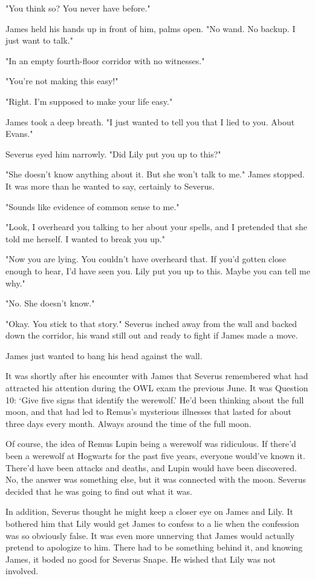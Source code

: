 "You think so? You never have before."

James held his hands up in front of him, palms open. "No wand. No backup. I just want to talk."

"In an empty fourth-floor corridor with no witnesses."

"You're not making this easy!"

"Right. I'm supposed to make your life easy."

James took a deep breath. "I just wanted to tell you that I lied to you. About Evans."

Severus eyed him narrowly. "Did Lily put you up to this?"

"She doesn't know anything about it. But she won't talk to me." James stopped. It was more than he wanted to say, certainly to Severus.

"Sounds like evidence of common sense to me."

"Look, I overheard you talking to her about your spells, and I pretended that she told me herself. I wanted to break you up."

"Now you are lying. You couldn't have overheard that. If you'd gotten close enough to hear, I'd have seen you. Lily put you up to this. Maybe you can tell me why."

"No. She doesn't know."

"Okay. You stick to that story." Severus inched away from the wall and backed down the corridor, his wand still out and ready to fight if James made a move.

James just wanted to bang his head against the wall.

It was shortly after his encounter with James that Severus remembered what had attracted his attention during the OWL exam the previous June. It was Question 10: `Give five signs that identify the werewolf.' He'd been thinking about the full moon, and that had led to Remus's mysterious illnesses that lasted for about three days every month. Always around the time of the full moon.

Of course, the idea of Remus Lupin being a werewolf was ridiculous. If there'd been a werewolf at Hogwarts for the past five years, everyone would've known it. There'd have been attacks and deaths, and Lupin would have been discovered. No, the answer was something else, but it was connected with the moon. Severus decided that he was going to find out what it was.

In addition, Severus thought he might keep a closer eye on James and Lily. It bothered him that Lily would get James to confess to a lie when the confession was so obviously false. It was even more unnerving that James would actually pretend to apologize to him. There had to be something behind it, and knowing James, it boded no good for Severus Snape. He wished that Lily was not involved.

